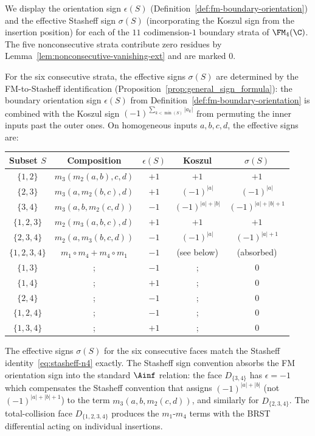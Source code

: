\begin{computation}[Explicit boundary signs for $n = 4$;
\ClaimStatusProvedHere]%
We display the orientation sign $\epsilon(S)$
(Definition~\ref{def:fm-boundary-orientation}) and the
effective Stasheff sign $\sigma(S)$ (incorporating the
Koszul sign from the insertion position) for each of the
$11$ codimension-$1$ boundary strata of $\FM_4(\C)$.
The five nonconsecutive strata contribute zero residues
by Lemma~\ref{lem:nonconsecutive-vanishing-ext} and are
marked $0$.

For the six consecutive strata, the effective signs
$\sigma(S)$ are determined by the FM-to-Stasheff
identification
(Proposition~\ref{prop:general_sign_formula}):
the boundary orientation sign
$\epsilon(S)$ from
Definition~\ref{def:fm-boundary-orientation} is combined with
the Koszul sign $(-1)^{\sum_{k < \min(S)} |a_k|}$ from
permuting the inner inputs past the outer ones. On homogeneous
inputs $a, b, c, d$, the effective signs are:

\begin{center}
\renewcommand{\arraystretch}{1.15}
\begin{tabular}{c|c|c|c|c}
\textbf{Subset $S$}
 & \textbf{Composition}
 & $\epsilon(S)$
 & \textbf{Koszul}
 & $\sigma(S)$ \\
\hline
$\{1,2\}$ & $m_3(m_2(a,b),c,d)$ & $+1$ & $+1$ & $+1$ \\
$\{2,3\}$ & $m_3(a,m_2(b,c),d)$ & $+1$ & $(-1)^{|a|}$ & $(-1)^{|a|}$ \\
$\{3,4\}$ & $m_3(a,b,m_2(c,d))$ & $-1$ & $(-1)^{|a|+|b|}$
 & $(-1)^{|a|+|b|+1}$ \\
$\{1,2,3\}$ & $m_2(m_3(a,b,c),d)$ & $+1$ & $+1$ & $+1$ \\
$\{2,3,4\}$ & $m_2(a,m_3(b,c,d))$ & $-1$ & $(-1)^{|a|}$
 & $(-1)^{|a|+1}$ \\
$\{1,2,3,4\}$ & $m_1 \circ m_4 + m_4 \circ m_1$ & $-1$ & (see below)
 & (absorbed) \\[4pt]
\hline
$\{1,3\}$ &; & $-1$ &; & $0$ \\
$\{1,4\}$ &; & $+1$ &; & $0$ \\
$\{2,4\}$ &; & $-1$ &; & $0$ \\
$\{1,2,4\}$ &; & $-1$ &; & $0$ \\
$\{1,3,4\}$ &; & $+1$ &; & $0$
\end{tabular}
\end{center}

\noindent
The effective signs $\sigma(S)$ for the six consecutive
faces match the Stasheff identity~\eqref{eq:stasheff-n4}
exactly. The Stasheff sign convention absorbs the FM
orientation sign into the standard $\Ainf$ relation:
the face $D_{\{3,4\}}$ has $\epsilon = -1$ which
compensates the Stasheff convention that assigns
$(-1)^{|a|+|b|}$ (not $(-1)^{|a|+|b|+1}$) to the
term $m_3(a,b,m_2(c,d))$, and similarly for
$D_{\{2,3,4\}}$. The total-collision face
$D_{\{1,2,3,4\}}$ produces the $m_1$-$m_4$ terms with
the BRST differential acting on individual insertions.


\end{computation}
